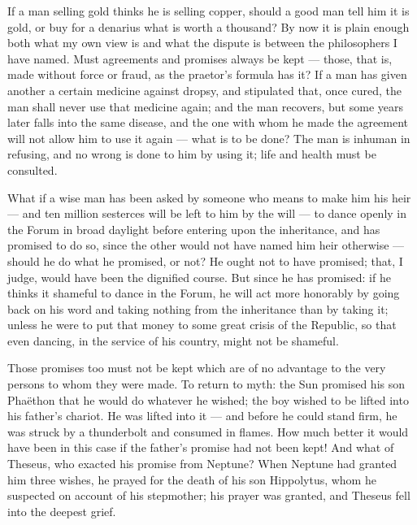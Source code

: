  If a man selling gold thinks he is selling copper, should a good man tell him it is gold, or buy for a denarius what is worth a thousand? By now it is plain enough both what my own view is and what the dispute is between the philosophers I have named. Must agreements and promises always be kept — those, that is, made without force or fraud, as the praetor's formula has it? If a man has given another a certain medicine against dropsy, and stipulated that, once cured, the man shall never use that medicine again; and the man recovers, but some years later falls into the same disease, and the one with whom he made the agreement will not allow him to use it again — what is to be done? The man is inhuman in refusing, and no wrong is done to him by using it; life and health must be consulted.

 What if a wise man has been asked by someone who means to make him his heir — and ten million sesterces will be left to him by the will — to dance openly in the Forum in broad daylight before entering upon the inheritance, and has promised to do so, since the other would not have named him heir otherwise — should he do what he promised, or not? He ought not to have promised; that, I judge, would have been the dignified course. But since he has promised: if he thinks it shameful to dance in the Forum, he will act more honorably by going back on his word and taking nothing from the inheritance than by taking it; unless he were to put that money to some great crisis of the Republic, so that even dancing, in the service of his country, might not be shameful.

 Those promises too must not be kept which are of no advantage to the very persons to whom they were made. To return to myth: the Sun promised his son Phaëthon that he would do whatever he wished; the boy wished to be lifted into his father's chariot. He was lifted into it — and before he could stand firm, he was struck by a thunderbolt and consumed in flames. How much better it would have been in this case if the father's promise had not been kept! And what of Theseus, who exacted his promise from Neptune? When Neptune had granted him three wishes, he prayed for the death of his son Hippolytus, whom he suspected on account of his stepmother; his prayer was granted, and Theseus fell into the deepest grief.


